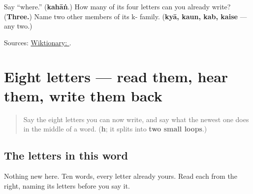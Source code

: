 \begin{tcolorbox}[breakable,colback=teal!4,colframe=teal!35!black,title={Before you move on}]
Say \textquotedblleft{}where.\textquotedblright{} (\textbf{kahāṅ}.) How many of its four letters can you already write? (\textbf{Three.}) Name two other members of its k- family. (\textbf{kyā, kaun, kab, kaise} — any two.)

Sources: \href{https://en.wiktionary.org/wiki/\%DA\%A9\%DB\%81\%D8\%A7\%DA\%BA}{Wiktionary: }.
\end{tcolorbox}
\section[\texorpdfstring{\ur{یہ} \ur{کام} \ur{کہانی} \ur{ہم} (yih, kām, kahānī, ham)}{یہ کام کہانی ہم (yih, kām, kahānī, ham)}]{Eight letters — read them, hear them, write them back}

\label{lesson:UR-C17-review-shapes}



\begin{quote}
Say the eight letters you can now write, and say what the newest one does in the middle of a word. (\textbf{h}; it splits into \textbf{two small loops}.)
\end{quote}

\subsection*{The letters in this word}
Nothing new here. Ten words, every letter already yours. Read each from the right, naming its letters before you say it.

\begin{quote}
\end{quote}

\begin{quote}
\end{quote}

\begin{quote}
\end{quote}

\begin{quote}
\end{quote}

\begin{quote}
\end{quote}

\begin{quote}
\end{quote}

